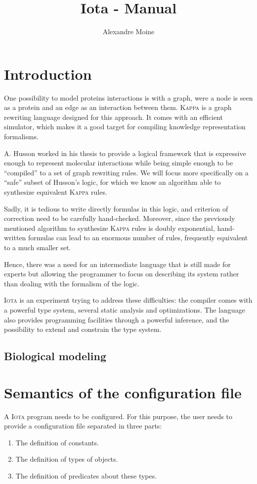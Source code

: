 \documentclass[10pt,a4paper]{article}
\author{Alexandre Moine}
\title{Iota - Manual}
\newcommand\Iota{\textsc{Iota}}
\newcommand\Kappa{\textsc{Kappa}}
\begin{document}
\maketitle
\tableofcontents

\section{Introduction}

One possibility to model proteins interactions is with a graph, were a node is seen as a protein and an edge as an interaction between them. \Kappa{}\cite{kappa} is a graph rewriting language designed for this approach. It comes with an efficient simulator, which makes it a good target for compiling knowledge representation formalisms.

A. Husson worked in his thesis\cite{husson} to provide a logical framework that is expressive enough to represent molecular interactions while being simple enough to be ``compiled'' to a set of graph rewriting rules. We will focus more specifically on a ``safe'' subset of Husson's logic, for which we know an algorithm able to synthesize equivalent \Kappa{} rules.

Sadly, it is tedious to write directly formulas in this logic, and criterion of correction need to be carefully hand-checked. Moreover, since the previously mentioned algorithm to synthesize \Kappa{} rules is doubly exponential, hand-written formulas can lead to an enormous number of rules, frequently equivalent to a much smaller set.

Hence, there was a need for an intermediate language that is still made for experts but allowing the programmer to focus on describing its system rather than dealing with the formalism of the logic.

\Iota{} is an experiment trying to address these difficulties: the compiler comes with a powerful type system, several static analysis and optimizations. The language also provides programming facilities through a powerful inference, and the possibility to extend and constrain the type system.

\subsection{Biological modeling}

\section{Semantics of the configuration file}
A \Iota{} program needs to be configured. For this purpose, the user needs to provide a configuration file separated in three parts:
\begin{enumerate}
\item The definition of constants.
\item The definition of types of objects.
\item The definition of predicates about these types.
\end{enumerate}
\end{document}
